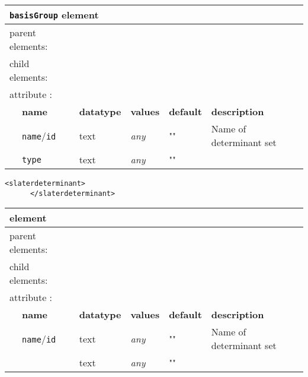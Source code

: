 \begin{table}[h]
\begin{center}
\begin{tabularx}{\textwidth}{l l l l l l }
\hline
\multicolumn{6}{l}{\texttt{basisGroup} element} \\
\hline
\multicolumn{2}{l}{parent elements:} & \multicolumn{4}{l}{\texttt{}}\\
\multicolumn{2}{l}{child  elements:} & \multicolumn{4}{l}{\texttt{}}\\
\multicolumn{2}{l}{attribute      :} & \multicolumn{4}{l}{}\\
   &   \bfseries name              & \bfseries datatype & \bfseries values & \bfseries default   & \bfseries description \\
   &   \texttt{name}/\texttt{id}   &  text              &  \textit{any}    &  ""                & Name of determinant set \\
   &   \texttt{type}                    &  text              &  \textit{any}    &  ""                &  \\
  \hline
\end{tabularx}
\end{center}
\end{table}

\begin{minipage}{\linewidth}
\begin{lstlisting}[caption=Basic input block for \texttt{slaterdeterminant} with an atom-centered \texttt{sposet}.]
      <slaterdeterminant>
      </slaterdeterminant>
\end{lstlisting}
\end{minipage}

\begin{table}[h]
\begin{center}
\begin{tabularx}{\textwidth}{l l l l l l }
\hline
\multicolumn{6}{l}{\texttt{} element} \\
\hline
\multicolumn{2}{l}{parent elements:} & \multicolumn{4}{l}{\texttt{}}\\
\multicolumn{2}{l}{child  elements:} & \multicolumn{4}{l}{\texttt{}}\\
\multicolumn{2}{l}{attribute      :} & \multicolumn{4}{l}{}\\
   &   \bfseries name              & \bfseries datatype & \bfseries values & \bfseries default   & \bfseries description \\
   &   \texttt{name}/\texttt{id}   &  text              &  \textit{any}    &  ""                & Name of determinant set \\
   &   \texttt{}                    &  text              &  \textit{any}    &  ""                &  \\
  \hline
\end{tabularx}
\end{center}
\end{table}

